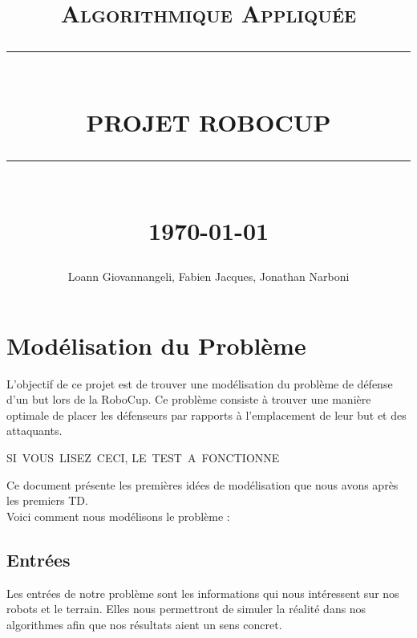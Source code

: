 \documentclass[12pt]{report}
\newcommand{\HRule}[1]{\rule{\linewidth}{#1}}
\begin{document}
\title{ \normalsize \textsc{Algorithmique Appliquée}
		\\ [2.0cm]
		\HRule{0.5pt} \\
		\LARGE \textbf{\uppercase{Projet RoboCup}}
		\HRule{2pt} \\ [0.5cm]
		\normalsize \today \vspace*{5\baselineskip}}

\date{}

\author{
		Loann Giovannangeli, Fabien Jacques, Jonathan Narboni}

\maketitle
\renewcommand{\contentsname}{Sommaire}
\tableofcontents
\newpage

\sectionfont{\scshape}


\part*{Modélisation du Problème}

L'objectif de ce projet est de trouver une modélisation du problème de défense d'un but lors de la RoboCup. Ce problème consiste à trouver une manière optimale de placer les défenseurs par rapports à l'emplacement de leur but et des attaquants.

SI VOUS LISEZ CECI, LE TEST A FONCTIONNE

Ce document présente les premières idées de modélisation que nous avons après les premiers TD.\\

Voici comment nous modélisons le problème :
\newline
\newline
\chapter{Entrées}
Les entrées de notre problème sont les informations qui nous intéressent sur nos robots et le terrain. Elles nous permettront de simuler la réalité dans nos algorithmes afin que nos résultats aient un sens concret.\\
\end{document}
